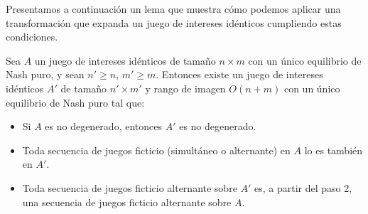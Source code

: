 Presentamos a continuación un lema que muestra cómo podemos aplicar una transformación que expanda un juego de intereses idénticos cumpliendo estas condiciones.

\begin{lemma}\label{lema:preservacion}
    Sea $A$ un juego de intereses idénticos de tamaño $n\times m$ con un único equilibrio de Nash puro, y sean $n'\geq n$, $m'\geq m$. Entonces existe un juego de intereses idénticos $A'$ de tamaño $n'\times m'$ y rango de imagen $O(n+m)$ con un único equilibrio de Nash puro tal que:
    \begin{itemize}
        \item Si $A$ es no degenerado, entonces $A'$ es no degenerado.
        \item Toda secuencia de juegos ficticio (simultáneo o alternante) en $A$ lo es también en $A'$.
        \item Toda secuencia de juegos ficticio alternante sobre $A'$ es, a partir del paso 2, una secuencia de juegos ficticio alternante sobre $A$.
    \end{itemize}
    
\end{lemma}
